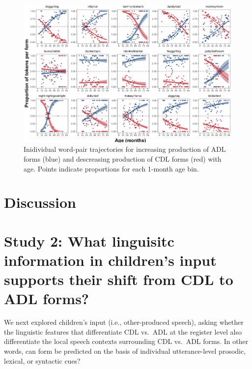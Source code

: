 \documentclass[10pt, letterpaper]{article}
\newenvironment{CodeChunk}{}{}
\begin{document}
\begin{CodeChunk}
\begin{figure}[!ht]

{\centering \includegraphics{figs/shift-timing-bypair-fig-1} 

}

\caption[Inidividual word-pair trajectories for increasing production of ADL forms (blue) and descreasing production of CDL forms (red) with age]{Inidividual word-pair trajectories for increasing production of ADL forms (blue) and descreasing production of CDL forms (red) with age. Points indicate proportions for each 1-month age bin.}\label{fig:shift-timing-bypair-fig}
\end{figure}
\end{CodeChunk}

\hypertarget{discussion}{%
\section{Discussion}\label{discussion}}

\hypertarget{study-2-what-linguisitc-information-in-childrens-input-supports-their-shift-from-cdl-to-adl-forms}{%
\section{Study 2: What linguisitc information in children's input
supports their shift from CDL to ADL
forms?}\label{study-2-what-linguisitc-information-in-childrens-input-supports-their-shift-from-cdl-to-adl-forms}}

We next explored children's input (i.e., other-produced speech), asking
whether the linguistic features that differentiate CDL vs.~ADL at the
register level also differentiate the local speech contexts surrounding
CDL vs.~ADL forms. In other words, can form be predicted on the basis of
individual utterance-level prosodic, lexical, or syntactic cues?
\end{document}
